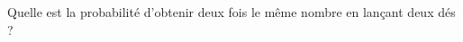 
\begin{exercice}\label{exosmath-0347}

    Quelle est la probabilité d'obtenir deux fois le même nombre en lançant deux dés ?

\end{exercice}
